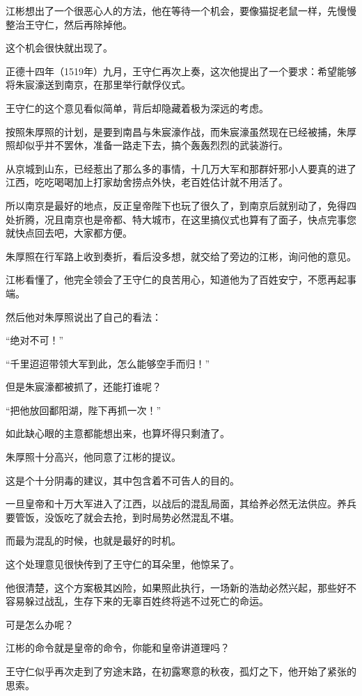 \begin{multicols}{\theparacolNo}
江彬想出了一个很恶心人的方法，他在等待一个机会，要像猫捉老鼠一样，先慢慢整治王守仁，然后再除掉他。

这个机会很快就出现了。

正德十四年（1519年）九月，王守仁再次上奏，这次他提出了一个要求：希望能够将朱宸濠送到南京，在那里举行献俘仪式。

王守仁的这个意见看似简单，背后却隐藏着极为深远的考虑。

按照朱厚照的计划，是要到南昌与朱宸濠作战，而朱宸濠虽然现在已经被捕，朱厚照却似乎并不罢休，准备一路走下去，搞个轰轰烈烈的武装游行。

从京城到山东，已经惹出了那么多的事情，十几万大军和那群奸邪小人要真的进了江西，吃吃喝喝加上打家劫舍捞点外快，老百姓估计就不用活了。

所以南京是最好的地点，反正皇帝陛下也玩了很久了，到南京后就别动了，免得四处折腾，况且南京也是帝都、特大城市，在这里搞仪式也算有了面子，快点完事您就快点回去吧，大家都方便。

朱厚照在行军路上收到奏折，看后没多想，就交给了旁边的江彬，询问他的意见。

江彬看懂了，他完全领会了王守仁的良苦用心，知道他为了百姓安宁，不愿再起事端。

然后他对朱厚照说出了自己的看法：

“绝对不可！”

“千里迢迢带领大军到此，怎么能够空手而归！”

但是朱宸濠都被抓了，还能打谁呢？

“把他放回鄱阳湖，陛下再抓一次！”

如此缺心眼的主意都能想出来，也算坏得只剩渣了。

朱厚照十分高兴，他同意了江彬的提议。

这是个十分阴毒的建议，其中包含着不可告人的目的。

一旦皇帝和十万大军进入了江西，以战后的混乱局面，其给养必然无法供应。养兵要管饭，没饭吃了就会去抢，到时局势必然混乱不堪。

而最为混乱的时候，也就是最好的时机。

这个处理意见很快传到了王守仁的耳朵里，他惊呆了。

他很清楚，这个方案极其凶险，如果照此执行，一场新的浩劫必然兴起，那些好不容易躲过战乱，生存下来的无辜百姓终将逃不过死亡的命运。

可是怎么办呢？

江彬的命令就是皇帝的命令，你能和皇帝讲道理吗？

王守仁似乎再次走到了穷途末路，在初露寒意的秋夜，孤灯之下，他开始了紧张的思索。


\end{multicols}
